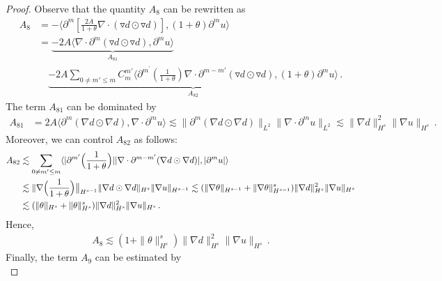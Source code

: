 \documentclass[reqno,11pt]{amsart}
\numberwithin{equation}{section}
\begin{document}
\begin{proof}
Observe that the quantity $A_8$ can be rewritten as
\begin{equation*}
\begin{aligned}
A_{8}&= -\langle\partial^m[\frac{2A}{1 + \theta}\nabla\cdot(\triangledown d\odot\triangledown d)],(1 + \theta)\partial^m u\rangle\\&
=\underset{A_{81}}{\underbrace{ -2A\langle\nabla\cdot\partial^m(\triangledown d\odot\triangledown d),\partial^m u\rangle}}\\&\quad
\underset{A_{82  }}{\underbrace{ -2A\sum_{0\neq m'\leq m}C_m^{m'}\langle\partial^{m^\prime} (\frac{1}{1 + \theta})\nabla\cdot\partial^{m - m'}(\triangledown d\odot\triangledown d),(1 + \theta)\partial^m u\rangle}} \,.
\end{aligned}
\end{equation*}
The term $A_{81}$ can be dominated by
\begin{equation*}
\begin{aligned}
A_{81}&=2A\langle\partial^m(\nabla d\odot \nabla d),\nabla \cdot\partial^m u\rangle \lesssim \bigl\|\partial^m(\nabla d \odot\nabla d)\bigr\|_{L^2}\bigl\|\nabla\cdot\partial^m u\bigr\|_{L^2} \lesssim\|\nabla d\|^2_{H^s} \|\nabla u\|_{H^s}
\,.
\end{aligned}
\end{equation*}
Moreover, we can control $A_{82}$ as follows:
\begin{equation*}
\begin{aligned}
A_{82}&\lesssim\sum_{0\neq m'\leq m} \langle|\partial^{m'}\Bigl(\frac{1}{1+\theta}\Bigr)|
|\nabla \cdot\partial^{m-m'}(\nabla d\odot\nabla d)|,
|\partial^m u|\rangle\\&
\lesssim\|\nabla\Bigl(\frac{1}{1+\theta}\Bigr)\bigr\|_{H^{s-1}}
\|\nabla d \odot\nabla d\|_{H^{s}}
\|\nabla u\|_{H^{s-1}} \lesssim(\|\nabla\theta\|_{H^{s-1}}+\|\nabla \theta\|^s_{H^{s-1}})
\|\nabla d\|^2_{H^{s}}
\|\nabla u\|_{H^s}\\
& \lesssim ( \| \theta \|_{H^{s}} + \| \theta \|^s_{H^s} )
\|\nabla d\|^2_{H^s}\|\nabla u\|_{H^s} \,.
\end{aligned}
\end{equation*}
Hence,
\begin{equation}\label{u-eq10}
\begin{aligned}
A_8 \lesssim(1+\|\theta\|^s_{H^s})
\|\nabla d\|^2_{H^s}\|\nabla u\|_{H^s} \,.
\end{aligned}
\end{equation}
Finally, the term $A_9$ can be estimated by
\begin{equation}\label{u-eq11}

\end{equation}
\end{proof}
\end{document}
